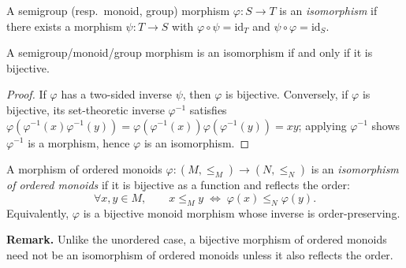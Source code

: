 \begin{definition}[Isomorphism]
\label{def:isomorphism}
A semigroup (resp.\ monoid, group) morphism \(\varphi:S\to T\) is an \emph{isomorphism} if there exists a morphism \(\psi:T\to S\) with \(\varphi\circ \psi=\mathrm{id}_T\) and \(\psi\circ \varphi=\mathrm{id}_S\).
\end{definition}

\begin{lemma}
\label{lem:iso-iff-bijective}
A semigroup/monoid/group morphism is an isomorphism if and only if it is bijective.
\end{lemma}
\begin{proof}
If \(\varphi\) has a two-sided inverse \(\psi\), then \(\varphi\) is bijective. Conversely, if \(\varphi\) is bijective, its set-theoretic inverse \(\varphi^{-1}\) satisfies \(\varphi(\varphi^{-1}(x)\varphi^{-1}(y))=\varphi(\varphi^{-1}(x))\varphi(\varphi^{-1}(y))=xy\); applying \(\varphi^{-1}\) shows \(\varphi^{-1}\) is a morphism, hence \(\varphi\) is an isomorphism.
\end{proof}

\begin{definition}
\label{def:ordered-monoid-isomorphism}
A morphism of ordered monoids \(\varphi:(M,\le_M)\to (N,\le_N)\) is an \emph{isomorphism of ordered monoids} if it is bijective as a function and reflects the order:
\[
\forall x,y\in M,\qquad x\le_M y \;\Longleftrightarrow\; \varphi(x)\le_N \varphi(y).
\]
Equivalently, \(\varphi\) is a bijective monoid morphism whose inverse is order-preserving.
\end{definition}

\noindent\textbf{Remark.}
Unlike the unordered case, a bijective morphism of ordered monoids need not be an isomorphism of ordered monoids unless it also reflects the order.